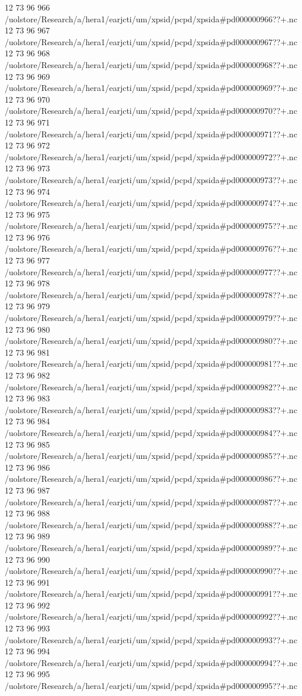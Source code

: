 12 73 96
966
/uolstore/Research/a/hera1/earjcti/um/xpsid/pcpd/xpsida#pd000000966??+.nc
12 73 96
967
/uolstore/Research/a/hera1/earjcti/um/xpsid/pcpd/xpsida#pd000000967??+.nc
12 73 96
968
/uolstore/Research/a/hera1/earjcti/um/xpsid/pcpd/xpsida#pd000000968??+.nc
12 73 96
969
/uolstore/Research/a/hera1/earjcti/um/xpsid/pcpd/xpsida#pd000000969??+.nc
12 73 96
970
/uolstore/Research/a/hera1/earjcti/um/xpsid/pcpd/xpsida#pd000000970??+.nc
12 73 96
971
/uolstore/Research/a/hera1/earjcti/um/xpsid/pcpd/xpsida#pd000000971??+.nc
12 73 96
972
/uolstore/Research/a/hera1/earjcti/um/xpsid/pcpd/xpsida#pd000000972??+.nc
12 73 96
973
/uolstore/Research/a/hera1/earjcti/um/xpsid/pcpd/xpsida#pd000000973??+.nc
12 73 96
974
/uolstore/Research/a/hera1/earjcti/um/xpsid/pcpd/xpsida#pd000000974??+.nc
12 73 96
975
/uolstore/Research/a/hera1/earjcti/um/xpsid/pcpd/xpsida#pd000000975??+.nc
12 73 96
976
/uolstore/Research/a/hera1/earjcti/um/xpsid/pcpd/xpsida#pd000000976??+.nc
12 73 96
977
/uolstore/Research/a/hera1/earjcti/um/xpsid/pcpd/xpsida#pd000000977??+.nc
12 73 96
978
/uolstore/Research/a/hera1/earjcti/um/xpsid/pcpd/xpsida#pd000000978??+.nc
12 73 96
979
/uolstore/Research/a/hera1/earjcti/um/xpsid/pcpd/xpsida#pd000000979??+.nc
12 73 96
980
/uolstore/Research/a/hera1/earjcti/um/xpsid/pcpd/xpsida#pd000000980??+.nc
12 73 96
981
/uolstore/Research/a/hera1/earjcti/um/xpsid/pcpd/xpsida#pd000000981??+.nc
12 73 96
982
/uolstore/Research/a/hera1/earjcti/um/xpsid/pcpd/xpsida#pd000000982??+.nc
12 73 96
983
/uolstore/Research/a/hera1/earjcti/um/xpsid/pcpd/xpsida#pd000000983??+.nc
12 73 96
984
/uolstore/Research/a/hera1/earjcti/um/xpsid/pcpd/xpsida#pd000000984??+.nc
12 73 96
985
/uolstore/Research/a/hera1/earjcti/um/xpsid/pcpd/xpsida#pd000000985??+.nc
12 73 96
986
/uolstore/Research/a/hera1/earjcti/um/xpsid/pcpd/xpsida#pd000000986??+.nc
12 73 96
987
/uolstore/Research/a/hera1/earjcti/um/xpsid/pcpd/xpsida#pd000000987??+.nc
12 73 96
988
/uolstore/Research/a/hera1/earjcti/um/xpsid/pcpd/xpsida#pd000000988??+.nc
12 73 96
989
/uolstore/Research/a/hera1/earjcti/um/xpsid/pcpd/xpsida#pd000000989??+.nc
12 73 96
990
/uolstore/Research/a/hera1/earjcti/um/xpsid/pcpd/xpsida#pd000000990??+.nc
12 73 96
991
/uolstore/Research/a/hera1/earjcti/um/xpsid/pcpd/xpsida#pd000000991??+.nc
12 73 96
992
/uolstore/Research/a/hera1/earjcti/um/xpsid/pcpd/xpsida#pd000000992??+.nc
12 73 96
993
/uolstore/Research/a/hera1/earjcti/um/xpsid/pcpd/xpsida#pd000000993??+.nc
12 73 96
994
/uolstore/Research/a/hera1/earjcti/um/xpsid/pcpd/xpsida#pd000000994??+.nc
12 73 96
995
/uolstore/Research/a/hera1/earjcti/um/xpsid/pcpd/xpsida#pd000000995??+.nc
